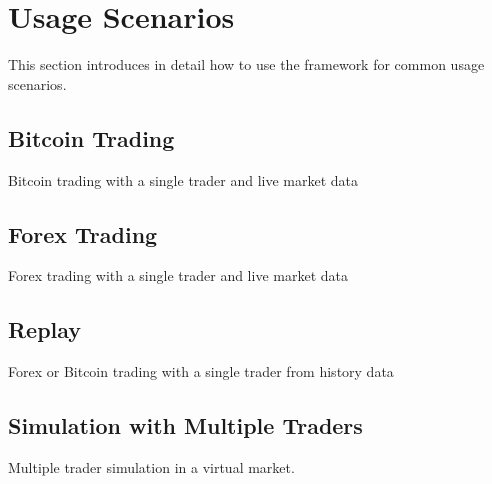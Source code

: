 \section{Usage Scenarios}
\label{sec:3}

This section introduces in detail how to use the framework for common usage scenarios.

\subsection{Bitcoin Trading}

Bitcoin trading with a single trader and live market data

\subsection{Forex Trading}

Forex trading with a single trader and live market data

\subsection{Replay}

Forex or Bitcoin trading with a single trader from history data

\subsection{Simulation with Multiple Traders}

Multiple trader simulation in a virtual market.
